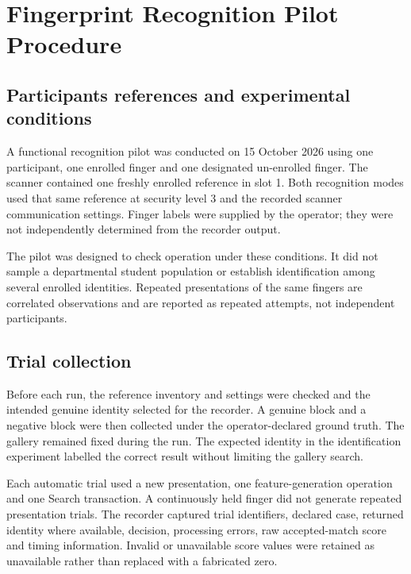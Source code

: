 \section{Fingerprint Recognition Pilot Procedure}\label{sec:3-11}

\subsection{Participants references and experimental conditions}\label{sec:3-11-1}

A functional recognition pilot was conducted on 15 October 2026 using one participant, one enrolled finger and one designated un-enrolled finger. The scanner contained one freshly enrolled reference in slot 1. Both recognition modes used that same reference at security level 3 and the recorded scanner communication settings. Finger labels were supplied by the operator; they were not independently determined from the recorder output.

The pilot was designed to check operation under these conditions. It did not sample a departmental student population or establish identification among several enrolled identities. Repeated presentations of the same fingers are correlated observations and are reported as repeated attempts, not independent participants.




\subsection{Trial collection}\label{sec:3-11-2}

Before each run, the reference inventory and settings were checked and the intended genuine identity selected for the recorder. A genuine block and a negative block were then collected under the operator-declared ground truth. The gallery remained fixed during the run. The expected identity in the identification experiment labelled the correct result without limiting the gallery search.

Each automatic trial used a new presentation, one feature-generation operation and one Search transaction. A continuously held finger did not generate repeated presentation trials. The recorder captured trial identifiers, declared case, returned identity where available, decision, processing errors, raw accepted-match score and timing information. Invalid or unavailable score values were retained as unavailable rather than replaced with a fabricated zero.

